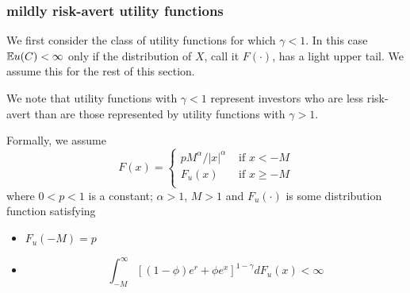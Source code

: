 \documentclass{article}
\begin{document}
\subsubsection{mildly risk-avert utility functions}
We first consider the class of utility functions for which $\gamma < 1$.
In this case $\mathbb{E} u(C) < \infty$ only if the distribution of $X$, call
it $F(\cdot)$, has a light upper tail. We assume this for the rest of
this section.

We note that utility functions with $\gamma < 1$ represent investors
who are less risk-avert than are those represented by utility
functions with $\gamma > 1$.

Formally, we assume
\begin{equation*}
  F(x) = \left\{
  \begin{array}{lr}
    p M^\alpha/|x|^\alpha & \text{ if } x < -M \\
    F_u(x) & \text{ if } x \geq -M \\
  \end{array}
  \right.
\end{equation*}
where $0 < p < 1$ is a constant; $\alpha > 1$, $M > 1$ and $F_u(\cdot)$
is some distribution function satisfying
\begin{itemize}
\item $F_u(-M) = p$
\item
  \[
  \int_{-M}^\infty [(1 - \phi) e^r + \phi e^x]^{1 - \gamma} d F_u(x) < \infty
  \]
\end{itemize}
\end{document}

